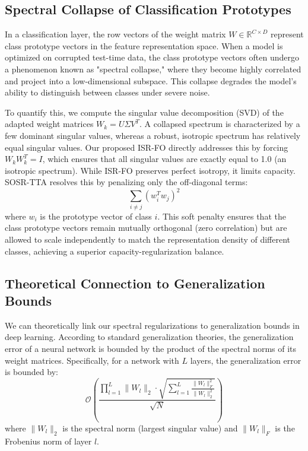 \documentclass{article}
\theoremstyle{plain}
\theoremstyle{definition}
\theoremstyle{remark}
\begin{document}
\subsection{Spectral Collapse of Classification Prototypes}
In a classification layer, the row vectors of the weight matrix $W \in \mathbb{R}^{C \times D}$ represent class prototype vectors in the feature representation space. When a model is optimized on corrupted test-time data, the class prototype vectors often undergo a phenomenon known as "spectral collapse," where they become highly correlated and project into a low-dimensional subspace. This collapse degrades the model's ability to distinguish between classes under severe noise.

To quantify this, we compute the singular value decomposition (SVD) of the adapted weight matrices $W_k = U \Sigma V^T$. A collapsed spectrum is characterized by a few dominant singular values, whereas a robust, isotropic spectrum has relatively equal singular values. Our proposed ISR-FO directly addresses this by forcing $W_k W_k^T = I$, which ensures that all singular values are exactly equal to 1.0 (an isotropic spectrum). While ISR-FO preserves perfect isotropy, it limits capacity. SOSR-TTA resolves this by penalizing only the off-diagonal terms:
\begin{equation}
  \sum_{i \neq j} (w_i^T w_j)^2
\end{equation}
where $w_i$ is the prototype vector of class $i$. This soft penalty ensures that the class prototype vectors remain mutually orthogonal (zero correlation) but are allowed to scale independently to match the representation density of different classes, achieving a superior capacity-regularization balance.

\subsection{Theoretical Connection to Generalization Bounds}
We can theoretically link our spectral regularizations to generalization bounds in deep learning. According to standard generalization theories, the generalization error of a neural network is bounded by the product of the spectral norms of its weight matrices. Specifically, for a network with $L$ layers, the generalization error is bounded by:
\begin{equation}
  \mathcal{O}\left( \frac{\prod_{l=1}^L \|W_l\|_2 \cdot \sqrt{\sum_{l=1}^L \frac{\|W_l\|_F^2}{\|W_l\|_2^2}}}{\sqrt{N}} \right)
\end{equation}
where $\|W_l\|_2$ is the spectral norm (largest singular value) and $\|W_l\|_F$ is the Frobenius norm of layer $l$. 
\end{document}
